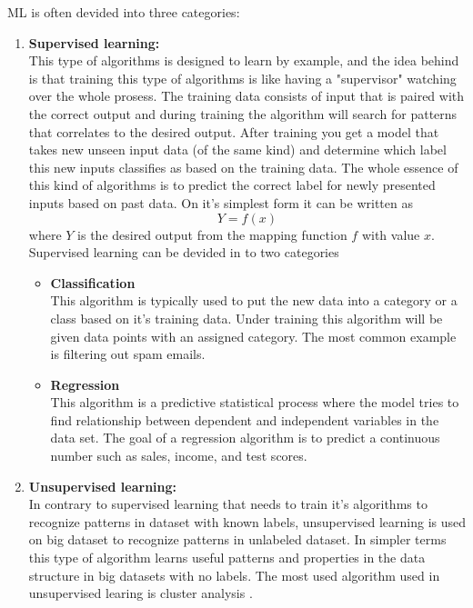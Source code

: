 \documentclass[conference]{IEEEtran}
\begin{document}
	 ML is often devided into three categories:
	 \begin{enumerate}
		 \item \textbf{Supervised learning:}\\
		       This type of algorithms is designed to learn by example, and the idea behind is that training this type of algorithms is like having
		       a "supervisor" watching over the whole prosess. The training data consists of input that is paired with the correct output and during
		       training the algorithm will search for patterns that correlates to the desired output. After training you get a model that takes new
		       unseen input data (of the same kind) and determine which label this new inputs classifies as based on the training data. The whole essence
		       of this kind of algorithms is to predict the correct label for newly presented inputs based on past data. On it's simplest form it can be written as
		       $$ Y = f(x) $$ where $Y$ is the desired output from the mapping function $f$ with value $x$. \cite{Wikipedia2020-ML} Supervised learning can be devided in to two categories
		       \begin{itemize}
			       \item \textbf{Classification}\\
			             This algorithm is typically used to put the new data into a category or a class based on it's training data. Under training this algorithm
			             will be given data points with an assigned category. The most common example is filtering out spam emails.
			       \item \textbf{Regression}\\
			             This algorithm is a predictive statistical process where the model tries to find relationship between dependent and independent variables
			             in the data set. The goal of a regression algorithm is to predict a continuous number such as sales, income, and test scores.
		       \end{itemize}

		 \item \textbf{Unsupervised learning:}\\
		       In contrary to supervised learning that needs to train it's algorithms to recognize patterns in dataset with known labels, unsupervised learning
		       is used on big dataset to recognize patterns in unlabeled dataset. In simpler terms this type of algorithm learns useful patterns and properties in
		       the data structure in big datasets with no labels. The most used algorithm used in unsupervised learing is cluster analysis \cite{deepAI:UL} \cite{wiki:UL}.


\end{enumerate}
\end{document}
